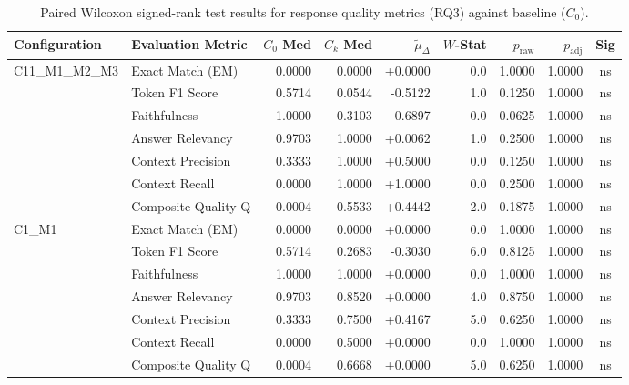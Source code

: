 \begin{table}[p]
\centering
\scriptsize
\setlength{\tabcolsep}{2.4pt}
\renewcommand{\arraystretch}{0.92}
\caption{Paired Wilcoxon signed-rank test results for response quality metrics (RQ3) against baseline ($C_0$).}
\label{tab:wilcoxon_rq3}
\begin{tabular*}{\textwidth}{@{\extracolsep{\fill}} l l r r r r r r c @{}}
\toprule
\textbf{Configuration} & \textbf{Evaluation Metric} & \textbf{$C_0$ Med} & \textbf{$C_k$ Med} & \textbf{$\tilde{\mu}_\Delta$} & \textbf{$W$-Stat} & \textbf{$p_{\text{raw}}$} & \textbf{$p_{\text{adj}}$} & \textbf{Sig} \\
\midrule
C11\_M1\_M2\_M3 & Exact Match (EM)     & 0.0000 & 0.0000 & +0.0000 & 0.0 & 1.0000 & 1.0000 & ns \\
                & Token F1 Score       & 0.5714 & 0.0544 & -0.5122 & 1.0 & 0.1250 & 1.0000 & ns \\
                & Faithfulness         & 1.0000 & 0.3103 & -0.6897 & 0.0 & 0.0625 & 1.0000 & ns \\
                & Answer Relevancy     & 0.9703 & 1.0000 & +0.0062 & 1.0 & 0.2500 & 1.0000 & ns \\
                & Context Precision    & 0.3333 & 1.0000 & +0.5000 & 0.0 & 0.1250 & 1.0000 & ns \\
                & Context Recall       & 0.0000 & 1.0000 & +1.0000 & 0.0 & 0.2500 & 1.0000 & ns \\
                & Composite Quality Q  & 0.0004 & 0.5533 & +0.4442 & 2.0 & 0.1875 & 1.0000 & ns \\
\addlinespace
C1\_M1          & Exact Match (EM)     & 0.0000 & 0.0000 & +0.0000 & 0.0 & 1.0000 & 1.0000 & ns \\
                & Token F1 Score       & 0.5714 & 0.2683 & -0.3030 & 6.0 & 0.8125 & 1.0000 & ns \\
                & Faithfulness         & 1.0000 & 1.0000 & +0.0000 & 0.0 & 1.0000 & 1.0000 & ns \\
                & Answer Relevancy     & 0.9703 & 0.8520 & +0.0000 & 4.0 & 0.8750 & 1.0000 & ns \\
                & Context Precision    & 0.3333 & 0.7500 & +0.4167 & 5.0 & 0.6250 & 1.0000 & ns \\
                & Context Recall       & 0.0000 & 0.5000 & +0.0000 & 0.0 & 1.0000 & 1.0000 & ns \\
                & Composite Quality Q  & 0.0004 & 0.6668 & +0.0000 & 5.0 & 0.6250 & 1.0000 & ns \\

\end{tabular*}
\end{table}
